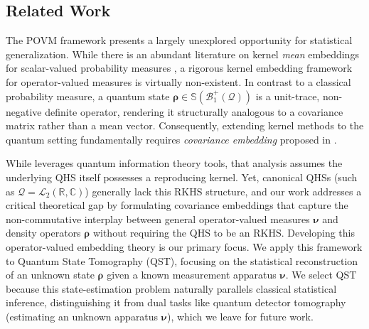 \documentclass[noinfoline]{imsart}\setcounter{tocdepth}{2}
\renewcommand{\b}[1]{\mathbb{#1}} %
\renewcommand{\c}[1]{\mathcal{#1}} %
\newcommand{\mb}[1]{\boldsymbol{#1}} %
\theoremstyle{plain}
\begin{document}
\subsection{Related Work}

The POVM framework presents a largely unexplored opportunity for statistical generalization. While there is an abundant literature on kernel \emph{mean} embeddings for scalar-valued probability measures \cite{fukumizu2004dimensionality, muandet2017kernel,smola2007hilbert, sriperumbudur2008injective, sriperumbudur2010hilbert, carmeli2010vector, gretton2012kernel}, a rigorous kernel embedding framework for operator-valued measures is virtually non-existent. 
In contrast to a classical probability measure, a quantum state $\mb{\rho} \in \b{S}(\c{B}_{1}^{+}(\c{Q}))$ is a unit-trace, non-negative definite operator, rendering it structurally analogous to a covariance matrix rather than a mean vector. Consequently, extending kernel methods to the quantum setting fundamentally requires \emph{covariance embedding} proposed in \cite{bach2022information}.

While \cite{bach2022information} leverages quantum information theory tools, 
that analysis assumes the underlying QHS itself possesses a reproducing kernel. Yet, canonical QHSs (such as $\c{Q} = \c{L}_{2}(\b{R}, \b{C})$) generally lack this RKHS structure, and our work addresses a critical theoretical gap by formulating covariance embeddings that capture the non-commutative interplay between general operator-valued measures $\mb{\nu}$ and density operators $\mb{\rho}$ without requiring the QHS to be an RKHS.
Developing this operator-valued embedding theory is our primary focus. We apply this framework to Quantum State Tomography (QST), focusing on the statistical reconstruction of an unknown state $\mb{\rho}$ given a known measurement apparatus $\mb{\nu}$. We select QST because this state-estimation problem naturally parallels classical statistical inference, distinguishing it from dual tasks like quantum detector tomography (estimating an unknown apparatus $\mb{\nu}$), which we leave for future work.
\end{document}
